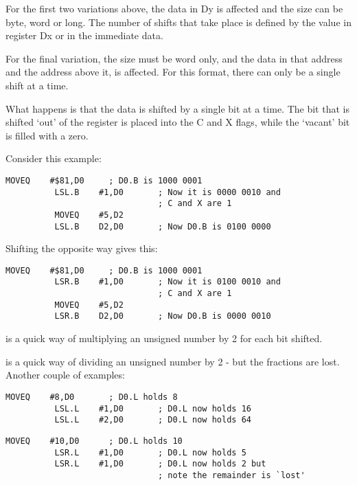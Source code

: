 For the first two variations above, the data in Dy is affected and
    the size can be byte, word or long. The number of shifts that take place
    is defined by the value in register Dx or in the immediate data.

For the final variation, the size must be word only, and the data in
    that address and the address above it, is affected. For this format, there
    can only be a single shift at a time.

What happens is that the data is shifted by a single bit at a time.
    The bit that is shifted `out' of the register is placed into the C and X
    flags, while the `vacant' bit is filled with a zero.

Consider this example:

\begin{lstlisting}[firstnumber=1,caption={LSL Example},label={lst:LslExample}]
          MOVEQ    #$81,D0     ; D0.B is 1000 0001
          LSL.B    #1,D0       ; Now it is 0000 0010 and 
                               ; C and X are 1
          MOVEQ    #5,D2
          LSL.B    D2,D0       ; Now D0.B is 0100 0000
\end{lstlisting}

Shifting the opposite way gives this:

\begin{lstlisting}[firstnumber=1,caption={LSR Example},label={lst:LsrExample}]
          MOVEQ    #$81,D0     ; D0.B is 1000 0001
          LSR.B    #1,D0       ; Now it is 0100 0010 and
                               ; C and X are 1
          MOVEQ    #5,D2
          LSR.B    D2,D0       ; Now D0.B is 0000 0010
\end{lstlisting}

 is a quick way of multiplying an unsigned number by 2 for each
    bit shifted.

 is a quick way of dividing an unsigned number by 2 -{} but the
    fractions are lost. Another couple of examples:

\begin{lstlisting}[firstnumber=1,caption={LSL Multlication Example},label={lst:LsMultiplicationlExample}]
          MOVEQ    #8,D0       ; D0.L holds 8
          LSL.L    #1,D0       ; D0.L now holds 16
          LSL.L    #2,D0       ; D0.L now holds 64
\end{lstlisting}

\begin{lstlisting}[firstnumber=1,caption={LSR Division Example},label={lst:LsrDivisionExample}]
          MOVEQ    #10,D0      ; D0.L holds 10
          LSR.L    #1,D0       ; D0.L now holds 5
          LSR.L    #1,D0       ; D0.L now holds 2 but
                               ; note the remainder is `lost'
\end{lstlisting}

